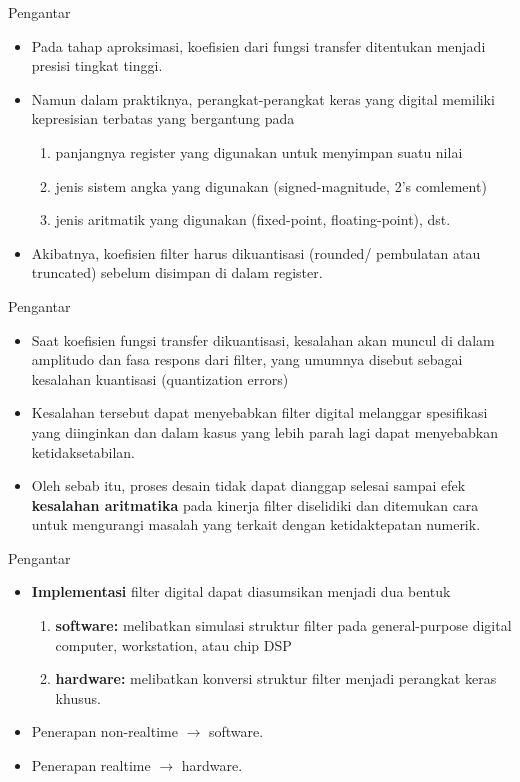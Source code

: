 \documentclass[pdflatex,compress,mathserif]{beamer}
\begin{document}
\begin{frame}{Pengantar}
	\begin{itemize}
		\item Pada tahap aproksimasi, koefisien dari fungsi transfer ditentukan menjadi presisi tingkat tinggi.
		\item Namun dalam praktiknya, perangkat-perangkat keras yang digital memiliki kepresisian terbatas yang bergantung pada
		\begin{enumerate}
			\item panjangnya register yang digunakan untuk menyimpan suatu nilai
			\item jenis sistem angka yang digunakan (signed-magnitude, 2's comlement)
			\item jenis aritmatik yang digunakan (fixed-point, floating-point), dst.
		\end{enumerate}
		\item Akibatnya, koefisien filter harus dikuantisasi (rounded/ pembulatan atau truncated) sebelum disimpan di dalam register.
	\end{itemize}
\end{frame}

\begin{frame}{Pengantar}
	\begin{itemize}
		\item Saat koefisien fungsi transfer dikuantisasi, kesalahan akan muncul di dalam amplitudo dan fasa respons dari filter, yang umumnya disebut sebagai kesalahan kuantisasi (quantization errors)
		\item Kesalahan tersebut dapat menyebabkan filter digital melanggar spesifikasi yang diinginkan dan dalam kasus yang lebih parah lagi dapat menyebabkan ketidaksetabilan.
		\item Oleh sebab itu, proses desain tidak dapat dianggap selesai sampai efek \textbf{kesalahan aritmatika} pada kinerja filter diselidiki dan ditemukan cara untuk mengurangi masalah yang terkait dengan ketidaktepatan numerik.
	\end{itemize}
\end{frame}

\begin{frame}{Pengantar}
	\begin{itemize}
		\item \textbf{Implementasi} filter digital dapat diasumsikan menjadi dua bentuk
		\begin{enumerate}
			\item \textbf{software:} melibatkan simulasi struktur filter pada general-purpose digital computer, workstation, atau chip DSP
			\item \textbf{hardware:} melibatkan konversi struktur filter menjadi perangkat keras khusus.
		\end{enumerate}
		\item Penerapan non-realtime $ \rightarrow $ software.
		\item Penerapan realtime $ \rightarrow $ hardware.
	\end{itemize}
\end{frame}
\end{document}
